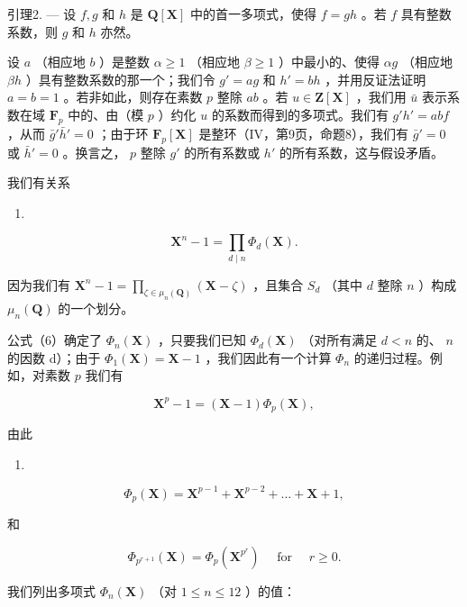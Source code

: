 引理2. --- 设 \(f, g\) 和 \(h\) 是 \(\mathbf{Q}[\mathbf{X}]\) 中的首一多项式，使得 \(f = gh\) 。若 \(f\) 具有整数系数，则 \(g\) 和 \(h\) 亦然。

设 \(a\) （相应地 \(b\) ）是整数 \(\alpha \geqslant 1\) （相应地 \(\beta \geqslant 1\) ）中最小的、使得 \(\alpha g\) （相应地 \(\beta h\) ）具有整数系数的那一个；我们令 \(g' = ag\) 和 \(h' = bh\) ，并用反证法证明 \(a = b = 1\) 。若非如此，则存在素数 \(p\) 整除 \(ab\) 。若 \(u \in \mathbf{Z}[\mathbf{X}]\) ，我们用 \(\bar{u}\) 表示系数在域 \(\mathbf{F}_p\) 中的、由（模 \(p\) ）约化 \(u\) 的系数而得到的多项式。我们有 \(g'h' = abf\) ，从而 \(\bar{g}'\bar{h}' = 0\) ；由于环 \(\mathbf{F}_p[\mathbf{X}]\) 是整环（IV，第9页，命题8），我们有 \(\bar{g}' = 0\) 或 \(\bar{h}' = 0\) 。换言之， \(p\) 整除 \(g'\) 的所有系数或 \(h'\) 的所有系数，这与假设矛盾。

我们有关系

\begin{enumerate}
\def\labelenumi{(\arabic{enumi})}
\setcounter{enumi}{5}
\tightlist
\item
\end{enumerate}

\[
\mathbf {X} ^ {n} - 1 = \prod_ {d \mid n} \Phi_ {d} (\mathbf {X}).
\]

因为我们有 \(\mathbf{X}^n - 1 = \prod_{\zeta \in \mu_n(\mathbf{Q})} (\mathbf{X} - \zeta)\) ，且集合 \(S_d\) （其中 \(d\) 整除 \(n\) ）构成 \(\mu_n(\mathbf{Q})\) 的一个划分。

公式（6）确定了 \(\Phi_n(\mathbf{X})\) ，只要我们已知 \(\Phi_d(\mathbf{X})\) （对所有满足 \(d < n\) 的、 \(n\) 的因数 d）；由于 \(\Phi_1(\mathbf{X}) = \mathbf{X} - 1\) ，我们因此有一个计算 \(\Phi_n\) 的递归过程。例如，对素数 \(p\) 我们有

\[
\mathbf {X} ^ {p} - 1 = (\mathbf {X} - 1) \Phi_ {p} (\mathbf {X}),
\]

由此

\begin{enumerate}
\def\labelenumi{(\arabic{enumi})}
\setcounter{enumi}{6}
\tightlist
\item
\end{enumerate}

\[
\Phi_ {p} (\mathbf {X}) = \mathbf {X} ^ {p - 1} + \mathbf {X} ^ {p - 2} + \dots + \mathbf {X} + 1,
\]

和

\[
\Phi_ {p ^ {r + 1}} (\mathbf {X}) = \Phi_ {p} \left(\mathbf {X} ^ {p ^ {r}}\right) \quad \text { for } \quad r \geqslant 0.
\]

我们列出多项式 \(\Phi_n(\mathbf{X})\) （对 \(1 \leqslant n \leqslant 12\) ）的值：

